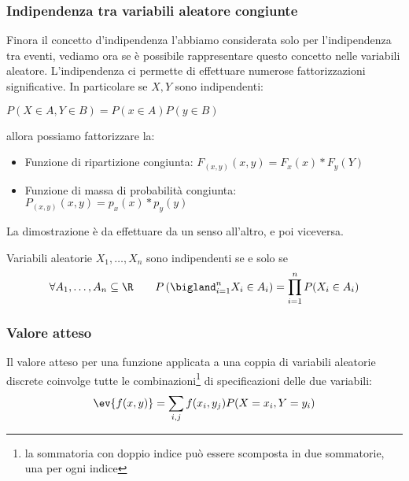 \subsubsection{Indipendenza tra variabili aleatore congiunte}
Finora il concetto d'indipendenza l'abbiamo considerata solo per l'indipendenza tra eventi, vediamo ora se è possibile rappresentare questo concetto nelle variabili aleatore. L'indipendenza ci permette di effettuare numerose fattorizzazioni significative.
In particolare se $X, Y$ sono indipendenti: 
\begin{center}
$P(X\in A, Y\in B) = P(x\in A)P(y\in B)$
\end{center}
allora possiamo fattorizzare la:
\begin{itemize}
\item Funzione di ripartizione congiunta: $F_{(x,y)} (x,y) = F_x (x) * F_y(Y)$
\item Funzione di massa di probabilità congiunta: $P_{(x,y)} (x,y) = p_x (x) * p_y(y)$
\end{itemize}
La dimostrazione è da effettuare da un senso all'altro, e poi viceversa.


\begin{defin}
	Variabili aleatorie $X_1,\dots,X_n$ sono indipendenti se e solo se
	\begin{equation*}
		\forall A_1,\dots,A_n\subseteq\R \qquad P\left(\bigland_{i=1}^n X_i\in A_i\right) = \prod_{i=1}^n P(X_i\in A_i)
	\end{equation*}
\end{defin}



\subsubsection{Valore atteso}
Il valore atteso per una funzione applicata a una coppia di variabili aleatorie discrete coinvolge tutte le combinazioni\footnote{la sommatoria con doppio indice può essere scomposta in due sommatorie, una per ogni indice} di specificazioni delle due variabili:
\begin{equation*}
	\ev{f(x,y)}=\sum_{i,j}f(x_i,y_j)P(X=x_i,Y=y_i)
\end{equation*}

